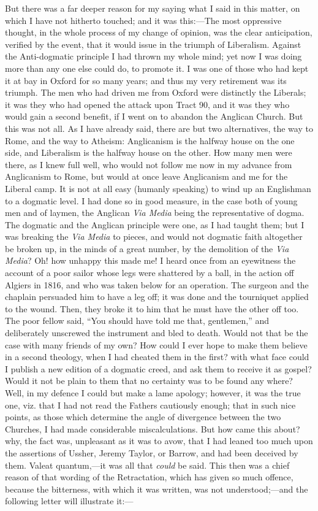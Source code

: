 But there was a far deeper reason for my saying what I said in this
matter, on which I have not hitherto touched; and it was this:—The
most oppressive thought, in the whole process of my change of opinion,
was the clear anticipation, verified by the event, that it would issue
in the triumph of Liberalism. Against the Anti-dogmatic principle I had
thrown my whole mind; yet now I was doing more than any one else could
do, to promote it. I was one of those who had kept it at bay in Oxford
for so many years; and thus my very retirement was its triumph. The men
who had driven me from Oxford were distinctly the Liberals; it was they
who had opened the attack upon Tract 90, and it was they who would gain
a second benefit, if I went on to abandon the Anglican
Church. But this was not all. As I have already said, there are but two
alternatives, the way to Rome, and the way to Atheism: Anglicanism is
the halfway house on the one side, and Liberalism is the halfway house
on the other. How many men were there, as I knew full well, who would
not follow me now in my advance from Anglicanism to Rome, but would at
once leave Anglicanism and me for the Liberal camp. It is not at all
easy (humanly speaking) to wind up an Englishman to a dogmatic level. I
had done so in good measure, in the case both of young men and of
laymen, the Anglican \emph{Via Media} being the representative of dogma.
The dogmatic and the Anglican principle were one, as I had taught them;
but I was breaking the \emph{Via Media} to pieces, and would not
dogmatic faith altogether be broken up, in the minds of a great
number, by the demolition of the \emph{Via Media}? Oh! how unhappy this made
me! I heard once from an eyewitness the account of a poor sailor whose
legs were shattered by a ball, in the action off Algiers in 1816, and
who was taken below for an operation. The surgeon and the chaplain
persuaded him to have a leg off; it was done and the tourniquet applied
to the wound. Then, they broke it to him that he must have the other off
too. The poor fellow said, ``You should have told me that,
gentlemen,'' and deliberately unscrewed the instrument and bled to
death. Would not that be the case with many friends of my own? How could
I ever hope to make them believe in a second theology, when I had
cheated them in the first? with what face could I publish a new edition
of a dogmatic creed, and ask them to receive it as gospel? Would it not
be plain to them that no certainty was to be found any where? Well, in
my defence I could but make a lame apology; however, it was the true
one, viz. that I had not read the Fathers cautiously enough;
that in such nice points, as those which determine the angle of
divergence between the two Churches, I had made considerable
miscalculations. But how came this about? why, the
fact was, unpleasant as it was to avow, that I had leaned too much upon
the assertions of Ussher, Jeremy Taylor, or Barrow, and had been
deceived by them. Valeat quantum,—it was all that \emph{could} be said. This
then was a chief reason of that wording of the Retractation, which has
given so much offence, because the bitterness, with which it was
written, was not understood;—and the following letter will
illustrate it:—

